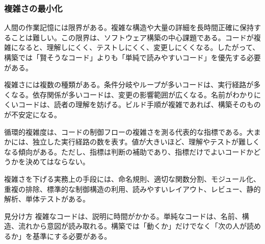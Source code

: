 \subsubsection{複雑さの最小化}

人間の作業記憶には限界がある。複雑な構造や大量の詳細を長時間正確に保持することは難しい。この限界は、ソフトウェア構築の中心課題である。コードが複雑になると、理解しにくく、テストしにくく、変更しにくくなる。したがって、構築では「賢そうなコード」よりも「単純で読みやすいコード」を優先する必要がある。

複雑さには複数の種類がある。条件分岐やループが多いコードは、実行経路が多くなる。依存関係が多いコードは、変更の影響範囲が広くなる。名前がわかりにくいコードは、読者の理解を妨げる。ビルド手順が複雑であれば、構築そのものが不安定になる。

循環的複雑度は、コードの制御フローの複雑さを測る代表的な指標である。大まかには、独立した実行経路の数を表す。値が大きいほど、理解やテストが難しくなる傾向がある。ただし、指標は判断の補助であり、指標だけでよいコードかどうかを決めてはならない。

複雑さを下げる実務上の手段には、命名規則、適切な関数分割、モジュール化、重複の排除、標準的な制御構造の利用、読みやすいレイアウト、レビュー、静的解析、単体テストがある。

\begin{keybox}{見分け方}
複雑なコードは、説明に時間がかかる。単純なコードは、名前、構造、流れから意図が読み取れる。構築では「動くか」だけでなく「次の人が読めるか」を基準にする必要がある。
\end{keybox}
